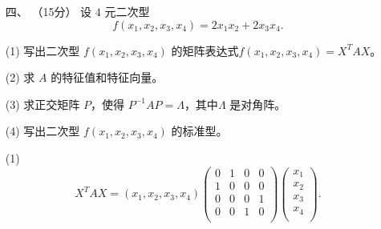 \begin{enumerate}[1~]
\begin{proof}
又容易验证 $E _ { 11 } - E _ { n n } , E _ { 12 } , \dots , E _ { 1 n } , E _ { 21 } , E _ { 22 } - E _ { n n } , E _ { 23 } , \dots , E _ { 2 n } , \dots , E _ { n - 1,1 } , \dots , E _ { n - 1 , n - 1 } - E _ { n n }, E _ { n - 1 , n } , E _ { n 1 } , E _ { n 2 } , \dots , E _ { n , n - 1 }$ 线性无关。因此它们就是 $V$ 的一个基，从而
\[
\dim V=n^2-1.
\]

(2) 第 1 步，证明$\mathbb{R}^{n\times n}=V+W$。任取$A=(a_{ij})\in \mathbb{R}^{n\times n}$，想把$A$表示成$A_1+A_2$，其中$A_1\in V, A_2\in W$。设$A_2=kI$，令$A_1=A-A_2$，它应满足${\rm tr}(A_1)=0$，即
$\left( a _ { 11 } + a _ { 22 } + \dots + a _ { n n } \right) - n k = 0$。于是有$k=\frac{1}{n}(a_{11}+a_{22} +\cdots+a+{nn})$。由此构造的$A_1$与$A_2$就满足$A=A_1+A_2$。于是$A\in V+W$。从而得出\[
\mathbb{R}^{n\times n}=V+W.
\]
第2步，证明和$V\oplus W$是直和。因为\[
\dim V+\dim W=n^2-1+1=n^2=\dim \mathbb{R}^{n\times n}=\dim(V+W).\]
所以和$V\oplus W$是直和。
\end{proof}

\item[四、]（15分）
设 $4$ 元二次型\[
f \left( x _ { 1 } , x _ { 2 } , x _ { 3 } , x _ { 4 } \right) = 2 x _ { 1 } x _ { 2 } + 2 x _ { 3 } x _ { 4 }.
\]

(1) 写出二次型 $f(x_1, x_2, x_3, x_4)$ 的矩阵表达式$ f(x_1, x_2, x_3, x_4) = X^T AX$。

(2) 求 $A$ 的特征值和特征向量。

(3) 求正交矩阵 $P$，使得 $P^{-1}AP = \Lambda$，其中$\Lambda$ 是对角阵。

(4) 写出二次型 $f(x_1, x_2, x_3, x_4)$ 的标准型。

\begin{solution}
(1) 
$$
X^T A X=\left( x_1,x_2,x_3,x_4 \right) \left( \begin{matrix}
	0&		1&		0&		0\\
	1&		0&		0&		0\\
	0&		0&		0&		1\\
	0&		0&		1&		0\\
\end{matrix} \right) \left( \begin{array}{c}
	x_1\\
	x_2\\
	x_3\\
	x_4\\
\end{array} \right).
$$


\end{solution}
\end{enumerate}

